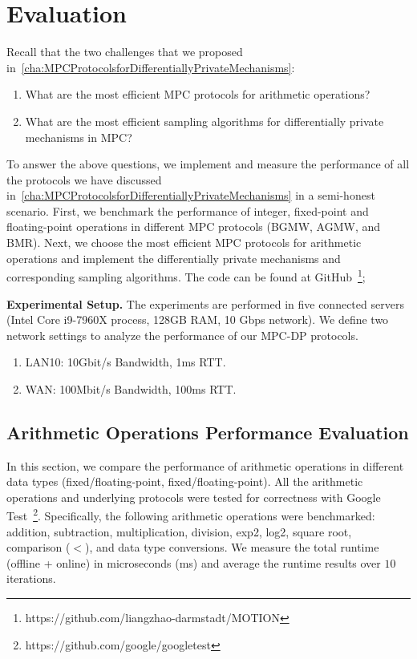 \chapter{Evaluation}
\label{cha:evaluation}

Recall that the two challenges that we proposed in~\autoref{cha:MPCProtocolsforDifferentiallyPrivateMechanisms}:
\begin{enumerate}
    \item What are the most efficient MPC protocols for arithmetic operations?
    \item What are the most efficient sampling algorithms for differentially private mechanisms in MPC?
\end{enumerate}

To answer the above questions, we implement and measure the performance of all the protocols we have discussed in~\autoref{cha:MPCProtocolsforDifferentiallyPrivateMechanisms} in a semi-honest scenario.
First, we benchmark the performance of integer, fixed-point and floating-point operations in different MPC protocols (BGMW, AGMW, and BMR).
Next, we choose the most efficient MPC protocols for arithmetic operations and implement the differentially private mechanisms and corresponding sampling algorithms.
The code can be found at GitHub~\footnote{https://github.com/liangzhao-darmstadt/MOTION};



\textbf{Experimental Setup.}
The experiments are performed in five connected servers (Intel Core i9-7960X process, 128GB RAM, 10 Gbps network). We define two network settings to analyze the performance of our MPC-DP protocols.
\begin{enumerate}
    \item LAN10: 10Gbit/s Bandwidth, 1ms RTT.
    \item WAN: 100Mbit/s Bandwidth, 100ms RTT.
\end{enumerate}

\section{Arithmetic Operations Performance Evaluation}
\label{sec:ArithmeticOperationsPerformanceEvaluation}
In this section, we compare the performance of arithmetic operations in different data types (\booleanGMW fixed/floating-point, \arithmeticGMW fixed/floating-point).
All the arithmetic operations and underlying protocols were tested for correctness with Google Test~\footnote{https://github.com/google/googletest}.
Specifically, the following arithmetic operations were benchmarked: addition, subtraction, multiplication, division, exp2, log2, square root, comparison ($<$), and data type conversions.
We measure the total runtime (offline + online) in microseconds (ms) and average the runtime results over $10$ iterations.

